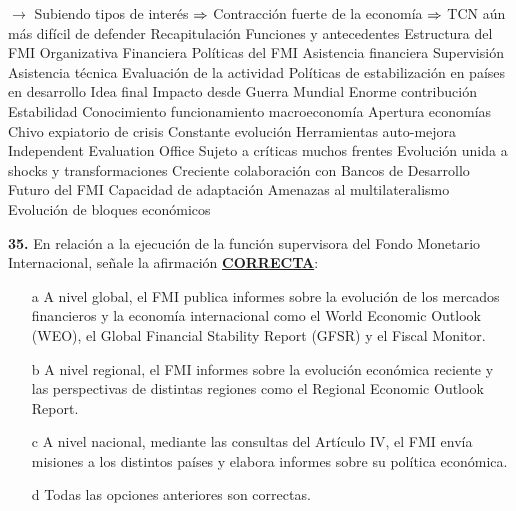 \documentclass{nuevotema}
\begin{document}
\begin{esquemal}
				\4[] $\to$ Subiendo tipos de interés
				\4[] $\Rightarrow$ Contracción fuerte de la economía
				\4[] $\Rightarrow$ TCN aún más difícil de defender
	\1[] 
		\2 Recapitulación
			\3 Funciones y antecedentes
			\3 Estructura del FMI
				\4 Organizativa
				\4 Financiera
			\3 Políticas del FMI
				\4 Asistencia financiera
				\4 Supervisión
				\4 Asistencia técnica
				\4 Evaluación de la actividad
			\3 Políticas de estabilización en países en desarrollo
		\2 Idea final
			\3 Impacto desde Guerra Mundial
				\4 Enorme contribución
				\4 Estabilidad
				\4 Conocimiento funcionamiento macroeconomía
				\4 Apertura economías
				\4 Chivo expiatorio de crisis
			\3 Constante evolución
				\4 Herramientas auto-mejora
				\4[] Independent Evaluation Office
				\4 Sujeto a críticas muchos frentes
				\4 Evolución unida a shocks y transformaciones
				\4 Creciente colaboración con Bancos de Desarrollo
			\3 Futuro del FMI
				\4 Capacidad de adaptación
				\4 Amenazas al multilateralismo
				\4 Evolución de bloques económicos
\end{esquemal}






























\preguntas


\textbf{35.} En relación a la ejecución de la función supervisora del Fondo Monetario Internacional, señale la afirmación \underline{\textbf{CORRECTA}}:

\begin{itemize}
	\item[a] A nivel global, el FMI publica informes sobre la evolución de los mercados financieros y la economía internacional como el World Economic Outlook (WEO), el Global Financial Stability Report (GFSR) y el Fiscal Monitor.
	\item[b] A nivel regional, el FMI informes sobre la evolución económica reciente y las perspectivas de distintas regiones como el Regional Economic Outlook Report.
	\item[c] A nivel nacional, mediante las consultas del Artículo IV, el FMI envía misiones a los distintos países y elabora informes sobre su política económica. 
	\item[d] Todas las opciones anteriores son correctas.
\end{itemize}
\end{document}
